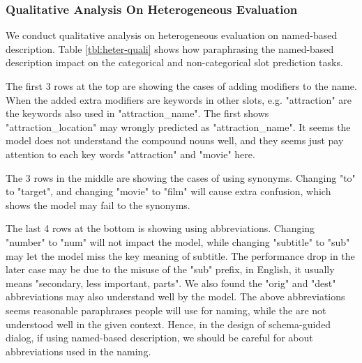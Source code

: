 \subsubsection{Qualitative Analysis On Heterogeneous Evaluation}
\label{sssec:qualitative-analysis}
We conduct qualitative analysis on heterogeneous evaluation on
named-based description. Table \ref{tbl:heter-quali} shows how paraphrasing the
named-based description impact on the categorical and non-categorical
slot prediction tasks.

The first 3 rows at the top are showing the cases of adding modifiers
to the name. When the added extra modifiers are keywords in other
slots, e.g. "attraction" are the keywords also used in
"attraction\_name". The first shows "attraction\_location" may wrongly
predicted as "attraction\_name". It seems the model does not understand
the compound nouns well, and they seems just pay attention to each key
words "attraction" and "movie" here.

The 3 rows in the middle are showing the cases of using
synonyms. Changing "to" to "target", and changing "movie" to "film" will
cause extra confusion, which shows the model may fail to the synonyms.

The last 4 rows at the bottom is showing using abbreviations. Changing
"number" to "num" will not impact the model, while changing "subtitle"
to "sub" may let the model miss the key meaning of subtitle.  The
performance drop in the later case may be due to the misuse of the
"sub" prefix, in English, it usually means "secondary, less important,
parts". We also found the "orig" and "dest" abbreviations may also
understand well by the model. The above abbreviations seems reasonable
paraphrases people will use for naming, while the are not understood
well in the given context. Hence, in the design of schema-guided
dialog, if using named-based description, we should be careful for
about abbreviations used in the naming.







